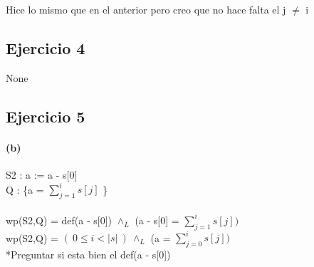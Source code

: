 \documentclass{article}
\begin{document}
\setlength{\parindent}{0mm}\indent*Hice lo mismo que en el anterior pero creo que no hace falta el j \( \neq \) i

\subsection{Ejercicio 4}
None
\subsection{Ejercicio 5}
\paragraph{(b)} S2 :  a := a - s[0]\\
\setlength{\parindent}{9mm}\indent Q : \{a = \(\sum\limits_{j=1}^{i} s[j]\)  \} \\
\\\setlength{\parindent}{9mm}\indent wp(S2,Q) = def(a - s[0]) \( \land_L\) (a - s[0] = \(\sum\limits_{j=1}^{i} s[j] )\)
\\\setlength{\parindent}{9mm}\indent wp(S2,Q) = \( (\: 0 \leq i < |s| \:) \: \land_L \) (a = \(\sum\limits_{j=0}^{i} s[j])\)
\\ *Preguntar si esta bien el def(a - s[0]) 
\end{document}
